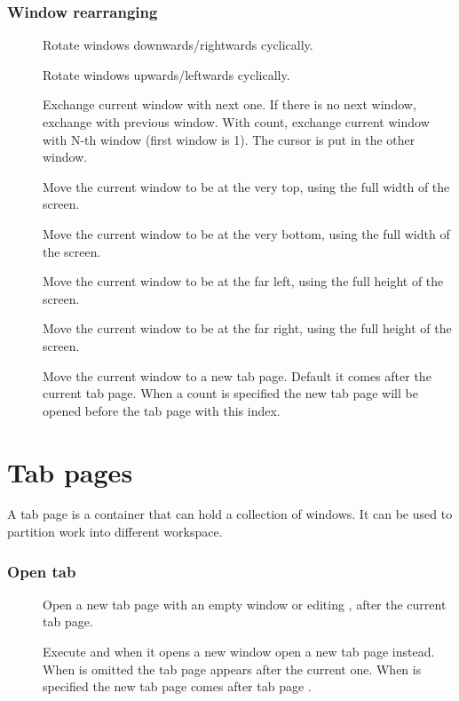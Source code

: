 \section{Window rearranging}
\begin{description}
  \item[] Rotate windows downwards/rightwards cyclically.
  \item[] Rotate windows upwards/leftwards cyclically.
  \item[] Exchange current window with next one. If there is no next window, exchange with previous window. With count, exchange current window with N-th window (first window is 1). The cursor is put in the other window.
  \item[] Move the current window to be at the very top, using the full width of the screen.
  \item[] Move the current window to be at the very bottom, using the full width of the screen.
  \item[] Move the current window to be at the far left, using the full height of the screen.
  \item[] Move the current window to be at the far right, using the full height of the screen.
  \item[] Move the current window to a new tab page. Default it comes after the current tab page. When a count is specified the new tab page will be opened before the tab page with this index.
\end{description}
%
\part{Tab pages}
A tab page is a container that can hold a collection of windows. It can be used to partition work into different workspace.
%
\section{Open tab}
\begin{description}
  \item[] 
  \item[] Open a new tab page with an empty window or editing \syntax{[file]}, after the current tab page.
  \item[] Execute  and when it opens a new window open a new tab page instead.  When \syntax{[count]} is omitted the tab page appears after the current one. When \syntax{[count]} is specified the new tab page comes after tab page \syntax{[count]}.
\end{description}
